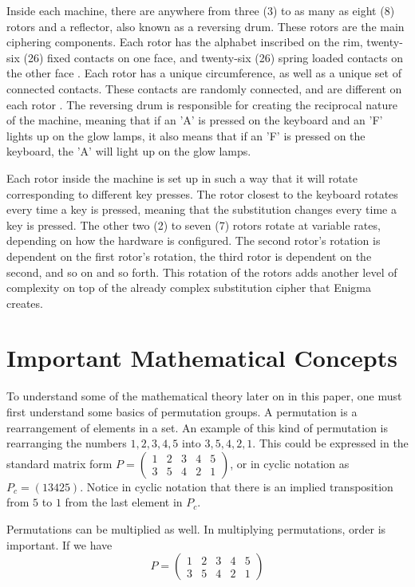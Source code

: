 Inside each machine, there are anywhere from three (3) to as many as eight (8) rotors and a reflector, also known as a reversing drum. These rotors are the main ciphering components. Each rotor has the alphabet inscribed on the rim, twenty-six (26) fixed contacts on one face, and twenty-six (26) spring loaded contacts on the other face \cite{wk85}. Each rotor has a unique circumference, as well as a unique set of connected contacts. These contacts are randomly connected, and are different on each rotor \cite{bw05}. The reversing drum is responsible for creating the reciprocal nature of the machine, meaning that if an 'A' is pressed on the keyboard and an 'F' lights up on the glow lamps, it also means that if an 'F' is pressed on the keyboard, the 'A' will light up on the glow lamps.

Each rotor inside the machine is set up in such a way that it will rotate corresponding to different key presses. The rotor closest to the keyboard rotates every time a key is pressed, meaning that the substitution changes every time a key is pressed. The other two (2) to seven (7) rotors rotate at variable rates, depending on how the hardware is configured. The second rotor's rotation is dependent on the first rotor's rotation, the third rotor is dependent on the second, and so on and so forth. This rotation of the rotors adds another level of complexity on top of the already complex substitution cipher that Enigma creates.

\section{Important Mathematical Concepts}\label{sec:mathconcepts}

To understand some of the mathematical theory later on in this paper, one must first understand some basics of permutation groups. A permutation is a rearrangement of elements in a set. An example of this kind of permutation is rearranging the numbers ${1,2,3,4,5}$ into ${3,5,4,2,1}$. This could be expressed in the standard matrix form
$P = \begin{pmatrix}
    1 & 2 & 3 & 4 & 5 \\
    3 & 5 & 4 & 2 & 1
  \end{pmatrix}$, or in cyclic notation as $P_c = (1 3 4 2 5)$. Notice in cyclic notation that there is an implied transposition from $5$ to $1$ from the last element in $P_c$.

Permutations can be multiplied as well. In multiplying permutations, order is important. If we have
$$P = \begin{pmatrix}
    1 & 2 & 3 & 4 & 5 \\
    3 & 5 & 4 & 2 & 1
  \end{pmatrix}$$

